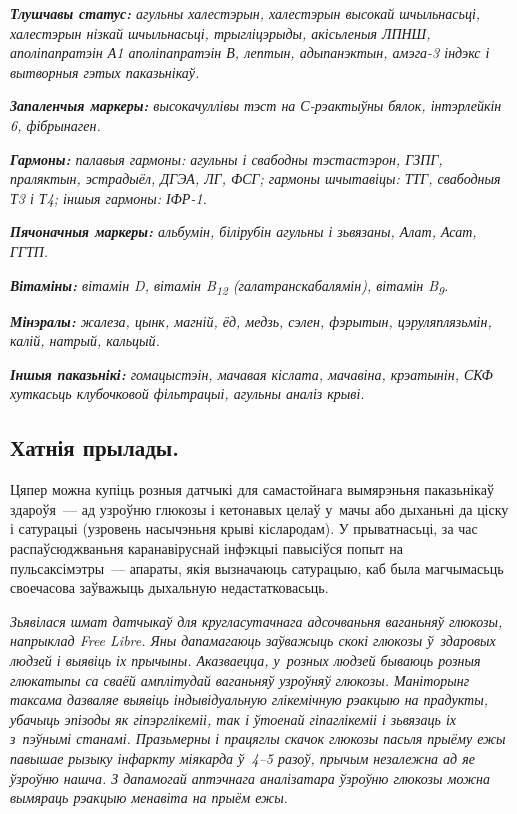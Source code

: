 \emph{\textbf{Тлушчавы статус:} агульны халестэрын, халестэрын высокай шчыльнасьці, халестэрын нізкай шчыльнасьці, трыгліцэрыды, акісьленыя ЛПНШ, аполіпапратэін А1 аполіпапратэін В, лептын, адыпанэктын, амэга-3 індэкс і вытворныя гэтых паказьнікаў.}

\emph{\textbf{Запаленчыя маркеры:} высокачуллівы тэст на С-рэактыўны бялок, інтэрлейкін 6, фібрынаген.}

\emph{\textbf{Гармоны:} палавыя гармоны: агульны і свабодны тэстастэрон, ГЗПГ, праляктын, эстрадыёл, ДГЭА, ЛГ, ФСГ; гармоны шчытавіцы: ТТГ, свабодныя Т3 і Т4; іншыя гармоны: ІФР-1.}

\emph{\textbf{Пячоначныя маркеры:} альбумін, білірубін агульны і зьвязаны, Алат, Асат, ГГТП.}

\emph{\textbf{Вітаміны:} вітамін D, вітамін B\textsubscript{12} (галатранскабалямін), вітамін B\textsubscript{9}.}

\emph{\textbf{Мінэралы:} жалеза, цынк, магній, ёд, медзь, сэлен, фэрытын, цэруляплязьмін, калій, натрый, кальцый.}

\emph{\textbf{Іншыя паказьнікі:} гомацыстэін, мачавая кіслата, мачавіна, крэатынін, СКФ хуткасьць клубочковой фільтрацыі, агульны аналіз крыві.}

\subsection*{Хатнія прылады.}

Цяпер можна купіць розныя датчыкі для самастойнага вымярэньня паказьнікаў здароўя~--- ад узроўню глюкозы і кетонавых целаў у~мачы або дыханьні да ціску і сатурацыі (узровень насычэньня крыві кіслародам). У прыватнасьці, за час распаўсюджваньня каранавіруснай інфэкцыі павысіўся попыт на пульсаксімэтры~--- апараты, якія вызначаюць сатурацыю, каб была магчымасьць своечасова заўважыць дыхальную недастатковасьць.

\emph{Зьявілася шмат датчыкаў для кругласутачнага адсочваньня ваганьняў глюкозы, напрыклад Free Libre. Яны дапамагаюць заўважыць скокі глюкозы ў~здаровых людзей і выявіць іх прычыны. Аказваецца, у~розных людзей бываюць розныя глюкатыпы са сваёй амплітудай ваганьняў узроўняў глюкозы. Маніторынг таксама дазваляе выявіць індывідуальную глікемічную рэакцыю на прадукты, убачыць эпізоды як гіпэрглікеміі, так і ўтоенай гіпаглікеміі і зьвязаць іх з~пэўнымі станамі. Празьмерны і працяглы скачок глюкозы пасьля прыёму ежы павышае рызыку інфаркту міякарда ў~4--5 разоў, прычым незалежна ад яе ўзроўню нашча. З дапамогай аптэчнага аналізатара ўзроўню глюкозы можна вымяраць рэакцыю менавіта на прыём ежы.}

